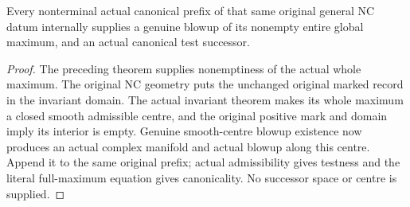 \begin{theorem}
\label{hir:general-nc-actual-global-canonical-successor}
\leanok
Every nonterminal actual canonical prefix of that same original
general NC datum internally supplies a genuine blowup of its nonempty
entire global maximum, and an actual canonical test successor.
\end{theorem}
\begin{proof}
The preceding theorem supplies nonemptiness of the actual whole maximum.
The original NC geometry puts the unchanged original marked record in
the invariant domain. The actual invariant theorem makes its whole
maximum a closed smooth admissible centre, and the original positive
mark and domain imply its interior is empty. Genuine smooth-centre
blowup existence now produces an actual complex manifold and actual
blowup along this centre. Append it to the same original prefix; actual
admissibility gives testness and the literal full-maximum equation gives
canonicality. No successor space or centre is supplied.
\end{proof}

